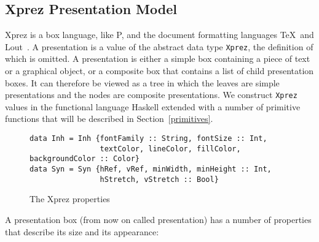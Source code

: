 %																
\subsection{{\sc Xprez} Presentation Model}

{\sc Xprez} is a box language, like P, and the document formatting languages \TeX ~and Lout~\cite{kingston93lout}. A presentation is a value of the abstract data type \texttt{Xprez}, the definition of which is omitted. A presentation is either a simple box containing a piece of text or a graphical object, or a composite box that contains a list of child presentation boxes. It can therefore be viewed as a tree in which the leaves are simple presentations and the nodes are composite presentations. We construct \texttt{Xprez} values in the functional language Haskell extended with a number of primitive functions that will be described in Section~\ref{primitives}.

\begin{figure}
\begin{small}
\begin{center}
\begin{small}
\begin{verbatim}
data Inh = Inh {fontFamily :: String, fontSize :: Int,
                textColor, lineColor, fillColor, backgroundColor :: Color} 
data Syn = Syn {hRef, vRef, minWidth, minHeight :: Int,
                hStretch, vStretch :: Bool}
\end{verbatim}
\end{small}
\caption{The {\sc Xprez} properties}\label{xprezproperties} 
\end{center}
\end{small}
\end{figure}
\pagebreak

A presentation box (from now on called presentation) has a number of properties that describe its size and its appearance: 

\begin{center}
\end{center}

